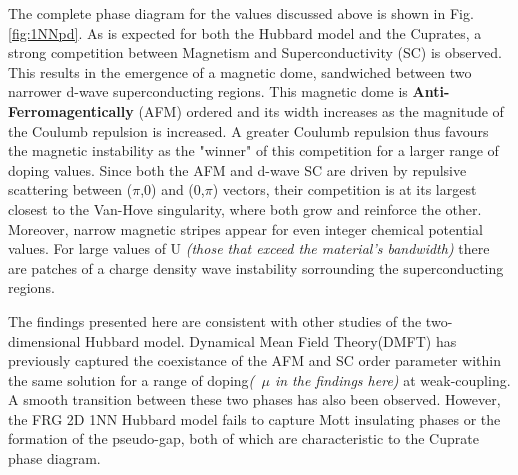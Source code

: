 \documentclass[12pt]{article}
\begin{document}
\medskip
\noindent The complete phase diagram for the values discussed above is shown in Fig.\ref{fig:1NNpd}. As is expected
for both the Hubbard model and the Cuprates\cite{kivelson1998electronic,fradkin2015colloquium,vanhala2018dynamical}, a strong competition between Magnetism and 
Superconductivity (SC) is observed. This results in the emergence of a magnetic dome, sandwiched between two narrower d-wave superconducting regions. This magnetic dome is 
\textbf{Anti-Ferromagentically} (AFM) ordered and its width increases as the magnitude of the Coulumb repulsion is increased. A greater Coulumb repulsion thus favours the magnetic instability as the "winner" of this competition for a larger range
of doping values. Since both the AFM and d-wave SC are driven by repulsive scattering between
($\pi$,0) and (0,$\pi$) vectors, their competition is at its largest closest to the Van-Hove singularity, where both grow and reinforce the other\cite{furukawa1998truncation,honerkamp2001temperature}. Moreover, narrow magnetic stripes appear for even
integer chemical potential values. For large values of U \textit{(those that exceed the material's bandwidth)} there are patches of a charge density wave instability sorrounding the superconducting regions.\par

\medskip

\noindent The findings presented here are consistent with other studies of the two-dimensional Hubbard model. Dynamical Mean Field Theory(DMFT) has previously captured the 
coexistance of the AFM and SC order parameter within the same solution for 
a range of doping\textit{(~$\mu$ in the findings here)} at weak-coupling. A smooth transition between these two phases has also been observed\cite{capone2006competition}. 
However, the FRG 2D 1NN Hubbard model fails to capture Mott insulating phases or the formation of the 
pseudo-gap\cite{katanin2009comparing,otsuki2014superconductivity}, both of which are characteristic to the Cuprate phase diagram. 
\end{document}
